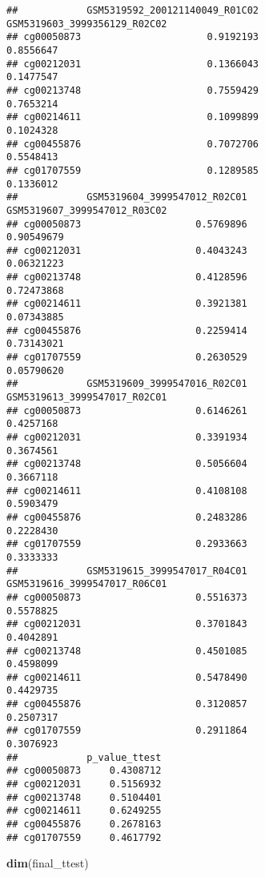 \documentclass[
]{article}
\newenvironment{Shaded}{\begin{snugshade}}{\end{snugshade}}
\newcommand{\FunctionTok}[1]{\textcolor[rgb]{0.13,0.29,0.53}{\textbf{#1}}}
\newcommand{\NormalTok}[1]{#1}
\begin{document}
\begin{verbatim}
##            GSM5319592_200121140049_R01C02 GSM5319603_3999356129_R02C02
## cg00050873                      0.9192193                    0.8556647
## cg00212031                      0.1366043                    0.1477547
## cg00213748                      0.7559429                    0.7653214
## cg00214611                      0.1099899                    0.1024328
## cg00455876                      0.7072706                    0.5548413
## cg01707559                      0.1289585                    0.1336012
##            GSM5319604_3999547012_R02C01 GSM5319607_3999547012_R03C02
## cg00050873                    0.5769896                   0.90549679
## cg00212031                    0.4043243                   0.06321223
## cg00213748                    0.4128596                   0.72473868
## cg00214611                    0.3921381                   0.07343885
## cg00455876                    0.2259414                   0.73143021
## cg01707559                    0.2630529                   0.05790620
##            GSM5319609_3999547016_R02C01 GSM5319613_3999547017_R02C01
## cg00050873                    0.6146261                    0.4257168
## cg00212031                    0.3391934                    0.3674561
## cg00213748                    0.5056604                    0.3667118
## cg00214611                    0.4108108                    0.5903479
## cg00455876                    0.2483286                    0.2228430
## cg01707559                    0.2933663                    0.3333333
##            GSM5319615_3999547017_R04C01 GSM5319616_3999547017_R06C01
## cg00050873                    0.5516373                    0.5578825
## cg00212031                    0.3701843                    0.4042891
## cg00213748                    0.4501085                    0.4598099
## cg00214611                    0.5478490                    0.4429735
## cg00455876                    0.3120857                    0.2507317
## cg01707559                    0.2911864                    0.3076923
##            p_value_ttest
## cg00050873     0.4308712
## cg00212031     0.5156932
## cg00213748     0.5104401
## cg00214611     0.6249255
## cg00455876     0.2678163
## cg01707559     0.4617792
\end{verbatim}

\begin{Shaded}
\begin{Highlighting}[]
\FunctionTok{dim}\NormalTok{(final\_ttest)}
\end{Highlighting}
\end{Shaded}
\end{document}
